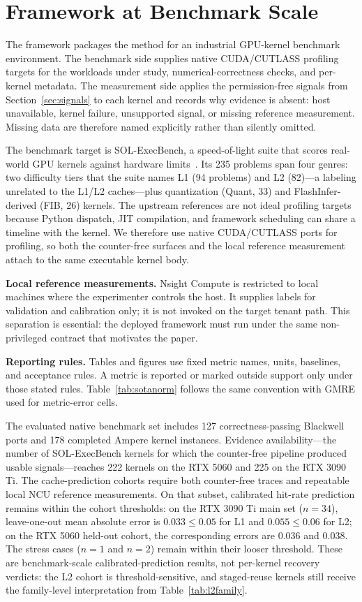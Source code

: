 \documentclass[conference]{IEEEtran}
\begin{document}
\section{Framework at Benchmark Scale}
\label{sec:framework}

The framework packages the method for an industrial GPU-kernel benchmark
environment. The benchmark side supplies native CUDA/CUTLASS profiling targets
for the workloads under study, numerical-correctness checks, and per-kernel
metadata. The measurement side applies the permission-free signals from
Section~\ref{sec:signals} to each kernel and records why evidence is absent:
host unavailable, kernel failure, unsupported signal, or missing reference
measurement. Missing data are therefore named explicitly rather than silently
omitted.

The benchmark target is SOL-ExecBench, a speed-of-light suite that scores
real-world GPU kernels against hardware limits~\cite{nvidia2026solexecbench}.
Its 235 problems span four genres: two difficulty tiers that the suite names
L1 (94 problems) and L2 (82)---a labeling unrelated to the L1/L2 caches---plus
quantization (Quant, 33) and FlashInfer-derived (FIB, 26) kernels.
The upstream references are not ideal profiling targets
because Python dispatch, JIT compilation, and framework scheduling can share a
timeline with the kernel. We therefore use native CUDA/CUTLASS ports for
profiling, so both the counter-free surfaces and the local reference measurement
attach to the same executable kernel body.

\textbf{Local reference measurements.} Nsight Compute is restricted to local
machines where the experimenter controls the host. It supplies labels for
validation and calibration only; it is not invoked on the target tenant path.
This separation is essential: the deployed framework must run under the same
non-privileged contract that motivates the paper.

\textbf{Reporting rules.} Tables and figures use fixed metric names, units,
baselines, and acceptance rules. A metric is reported or marked outside support
only under those stated rules. Table~\ref{tab:sotanorm} follows the same
convention with GMRE used for metric-error cells.

The evaluated native benchmark set includes 127 correctness-passing Blackwell
ports and 178 completed Ampere kernel instances. Evidence availability---the
number of SOL-ExecBench kernels for which the counter-free pipeline produced
usable signals---reaches 222 kernels on the RTX 5060 and 225 on the RTX 3090 Ti. The cache-prediction
cohorts require both counter-free traces and repeatable local NCU reference
measurements. On that subset, calibrated hit-rate prediction remains within the
cohort thresholds: on the RTX 3090 Ti main set ($n{=}34$), leave-one-out mean
absolute error is $0.033 \le 0.05$ for L1 and $0.055 \le 0.06$ for L2; on the
RTX 5060 held-out cohort, the corresponding errors are $0.036$ and $0.038$.
The stress cases ($n{=}1$ and $n{=}2$) remain within their looser threshold.
These are benchmark-scale calibrated-prediction results, not per-kernel
recovery verdicts: the L2 cohort is threshold-sensitive, and staged-reuse
kernels still receive the family-level interpretation from Table~\ref{tab:l2family}.
\end{document}
